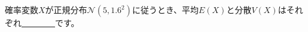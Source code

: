 \documentclass[fontsize=16pt]{jlreq}
\begin{document}
確率変数$X$が正規分布$\mathcal{N}(5, 1.6^2)$に従うとき、平均$E(X)$と分散$V(X)$はそれぞれ\underline{　　　　}です。
\end{document}
